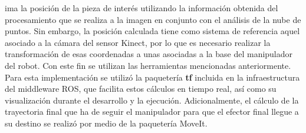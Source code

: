 ima la posición de la pieza de interés utilizando la información obtenida del procesamiento que se realiza a la imagen en conjunto con el análisis de la nube de puntos. Sin embargo, la posición calculada tiene como sistema de referencia aquel asociado a la cámara del sensor Kinect, por lo que es necesario realizar la transformación de esas coordenadas a unas asociadas a la base del manipulador del robot. Con este fin se utilizan las herramientas mencionadas anteriormente. Para esta implementación se utilizó la paquetería \textbf{tf}\cite{tf_ROS} incluida en la infraestructura del middleware ROS, que facilita estos cálculos en tiempo real, así como su visualización durante el desarrollo y la ejecución. Adicionalmente, el cálculo de la trayectoria final que ha de seguir el manipulador para que el efector final llegue a su destino se realizó por medio de la paquetería MoveIt.



